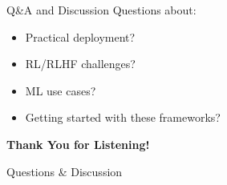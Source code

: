 \documentclass[aspectratio=169]{beamer}
\begin{document}
\begin{frame}{Q\&A and Discussion}
  \centering
  \Large
  Questions about:
  \begin{itemize}
    \item Practical deployment?
    \item RL/RLHF challenges?
    \item ML use cases?
    \item Getting started with these frameworks?
  \end{itemize}
\end{frame}

\begin{frame}[plain]
  \begin{center}
    \vspace{3cm}
    \Huge\textbf{Thank You for Listening!}
    
    \vspace{2cm}
    \Large Questions \& Discussion
  \end{center}
\end{frame}
\end{document}
